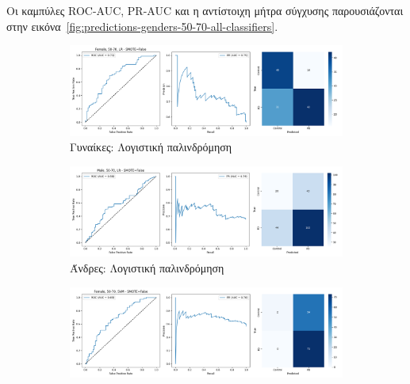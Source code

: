 \documentclass[12pt]{report}
\begin{document}
                \par
                    Οι καμπύλες ROC-AUC, PR-AUC και η αντίστοιχη μήτρα σύγχυσης παρουσιάζονται στην εικόνα~\ref{fig:predictions-genders-50-70-all-classifiers}.                
                \begin{figure}[H]
                    \centering
                    \begin{subfigure}[b]{0.48\textwidth}
                        \includegraphics[width=\textwidth]{ML/Predict/DEG/AUC/results_stratified_Female_50-70_LR_useSMOTE_False.png}
                        \caption{Γυναίκες: Λογιστική παλινδρόμηση}
                        \label{fig:results_stratified_Female_50-70_LR_useSMOTE_False}
                    \end{subfigure}
                    \hfill
                    \begin{subfigure}[b]{0.48\textwidth}
                        \includegraphics[width=\textwidth]{ML/Predict/DEG/AUC/results_stratified_Male_50-70_LR_useSMOTE_False.png}
                        \caption{Άνδρες: Λογιστική παλινδρόμηση}
                        \label{fig:results_stratified_Male_50-70_LR_useSMOTE_False}
                    \end{subfigure}
                    \vspace{0.5cm}
                    \begin{subfigure}[b]{0.48\textwidth}
                        \includegraphics[width=\textwidth]{ML/Predict/DEG/AUC/results_stratified_Female_50-70_SVM_useSMOTE_False.png}

\end{subfigure}
\end{figure}
\end{document}
